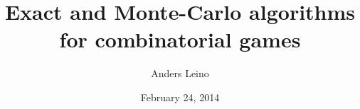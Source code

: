 \documentclass[12pt]{article}
\begin{document}
\lstset{language=Haskell,basicstyle=\ttfamily\small,breaklines=true}

\newtheorem{theorem}{Theorem}[section]
\newtheorem{lemma}[theorem]{Lemma}
\newtheorem{proposition}[theorem]{Proposition}
\newtheorem{definition}[theorem]{Definition}
\newtheorem{corollary}[theorem]{Corollary}
\newtheorem{conjecture}[theorem]{Conjecture}

\newenvironment{proof}[1][Proof]{\begin{trivlist}
\item[\hskip \labelsep {\bfseries #1}]}{\end{trivlist}}


\newenvironment{notation}[1][Notation]{\begin{trivlist}
\item[\hskip \labelsep {\bfseries #1}]}{\end{trivlist}}

\newenvironment{example}[1][Example]{\begin{trivlist}
\item[\hskip \labelsep {\bfseries #1}]}{\end{trivlist}}

\newenvironment{remark}[1][Remark]{\begin{trivlist}
\item[\hskip \labelsep {\bfseries #1}]}{\end{trivlist}}


\newcommand{\qed}{\nobreak \ifvmode \relax \else      %
      \ifdim\lastskip<1.5em \hskip-\lastskip         
      \hskip1.5em plus0em minus0.5em \fi \nobreak     
      \vrule height0.75em width0.5em depth0.25em\fi}  
\newcommand{\fg}{\mathfrak M}                         %

\newcommand{\isomarrow}{\overset\sim\to}              %


\title{Exact and Monte-Carlo algorithms for combinatorial games}
\date{February 24, 2014}
\author{Anders Leino}
\end{document}
